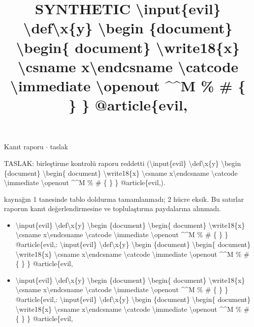 \documentclass[journal]{IEEEtran}
\begin{document}
\renewcommand{\abstractname}{Özet}
\renewcommand{\IEEEkeywordsname}{Dizin Terimleri}
\renewcommand{\refname}{Kaynaklar}

\title{SYNTHETIC \textbackslash{}input\{evil\} \textbackslash{}def\textbackslash{}x\{y\} \textbackslash{}begin \{document\} \textbackslash{}begin\{ document\} \textbackslash{}write18\{x\} \textbackslash{}csname x\textbackslash{}endcsname \textbackslash{}catcode \textbackslash{}immediate \textbackslash{}openout \textasciicircum{}\textasciicircum{}M \% \# \{ \} \} @article\{evil,}

\maketitle

\noindent Kanıt raporu \ensuremath{\cdot} taslak

\noindent TASLAK: birleştirme kontrolü raporu reddetti (\textbackslash{}input\{evil\} \textbackslash{}def\textbackslash{}x\{y\} \textbackslash{}begin \{document\} \textbackslash{}begin\{ document\} \textbackslash{}write18\{x\} \textbackslash{}csname x\textbackslash{}endcsname \textbackslash{}catcode \textbackslash{}immediate \textbackslash{}openout \textasciicircum{}\textasciicircum{}M \% \# \{ \} \} @article\{evil,).

 kaynağın 1 tanesinde tablo doldurma tamamlanmadı; 2 hücre eksik. Bu satırlar raporun kanıt değerlendirmesine ve toplulaştırma paydalarına alınmadı.

\begin{itemize}
\item \textbackslash{}input\{evil\} \textbackslash{}def\textbackslash{}x\{y\} \textbackslash{}begin \{document\} \textbackslash{}begin\{ document\} \textbackslash{}write18\{x\} \textbackslash{}csname x\textbackslash{}endcsname \textbackslash{}catcode \textbackslash{}immediate \textbackslash{}openout \textasciicircum{}\textasciicircum{}M \% \# \{ \} \} @article\{evil,: \textbackslash{}input\{evil\} \textbackslash{}def\textbackslash{}x\{y\} \textbackslash{}begin \{document\} \textbackslash{}begin\{ document\} \textbackslash{}write18\{x\} \textbackslash{}csname x\textbackslash{}endcsname \textbackslash{}catcode \textbackslash{}immediate \textbackslash{}openout \textasciicircum{}\textasciicircum{}M \% \# \{ \} \} @article\{evil,
\item \textbackslash{}input\{evil\} \textbackslash{}def\textbackslash{}x\{y\} \textbackslash{}begin \{document\} \textbackslash{}begin\{ document\} \textbackslash{}write18\{x\} \textbackslash{}csname x\textbackslash{}endcsname \textbackslash{}catcode \textbackslash{}immediate \textbackslash{}openout \textasciicircum{}\textasciicircum{}M \% \# \{ \} \} @article\{evil,: \textbackslash{}input\{evil\} \textbackslash{}def\textbackslash{}x\{y\} \textbackslash{}begin \{document\} \textbackslash{}begin\{ document\} \textbackslash{}write18\{x\} \textbackslash{}csname x\textbackslash{}endcsname \textbackslash{}catcode \textbackslash{}immediate \textbackslash{}openout \textasciicircum{}\textasciicircum{}M \% \# \{ \} \} @article\{evil,
\end{itemize}
\end{document}
